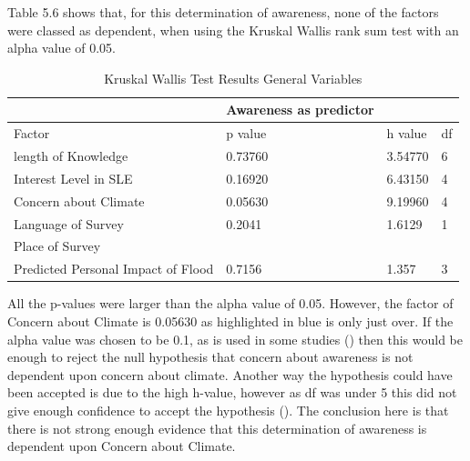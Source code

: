 Table 5.6 shows that, for this determination of awareness, none of the factors were classed as dependent, when using the Kruskal Wallis rank sum test with an alpha value of 0.05.

\begin{table}[H]
    \centering
    \begin{tabular}{|l|l|l|l|}
    \hline
         ~ &Awareness as predictor & ~ & ~ \\ \hline
        Factor & p value & h value & df \\ \hline
           length of Knowledge & 0.73760 & 3.54770 & 6 \\ \hline
       Interest Level in SLE & 0.16920 & 6.43150 & 4 \\ \hline
        Concern about Climate & \cellcolor[HTML]{7df9ff} 0.05630 & 9.19960 & 4 \\ \hline
        Language of Survey & 0.2041 & 1.6129 & 1 \\ \hline
        Place of Survey & & & \\ \hline
        Predicted Personal Impact of Flood & 0.7156 & 1.357 & 3 \\ \hline
    \end{tabular}
    \caption{Kruskal Wallis Test Results General Variables}
    \label{Kruskal_wallis_test_general}
\end{table}

All the p-values were larger than the alpha value of 0.05. However, the factor of Concern about Climate  is 0.05630 as highlighted in blue is only just over.  If the alpha value was chosen to be 0.1, as is used in some studies (\cite{hollander_nonparametric_2014}) then this would be enough to reject the null hypothesis that concern about awareness is not dependent upon concern about climate. Another way the hypothesis could have been accepted is due to the high h-value, however as df was under 5 this did not give enough confidence to accept the hypothesis (\cite{minitab_interpret_2022}). The conclusion here is that there is not strong enough evidence that this determination of awareness is dependent upon Concern about Climate.




